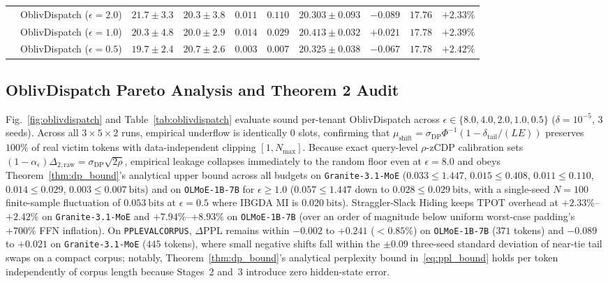 \documentclass[11pt,a4paper]{article}
\renewcommand{\_}{\textunderscore\allowbreak}
\def\OD{OblivDispatch}%
\theoremstyle{definition}
\theoremstyle{remark}
\newcommand{\OD}{\textsc{OblivDispatch}}
\begin{document}
\begin{table}[htbp]
{\begin{tabular}{llcccccccc}
      & \OD{} ($\epsilon = 2.0$) & $\mathbf{21.7 \pm 3.3}$ & $\mathbf{20.3 \pm 3.8}$ & $\mathbf{0.011}$ & $0.110$ & $20.303 \pm 0.093$ & $-0.089$ & $17.76$ & $+2.33\%$ \\
      & \OD{} ($\epsilon = 1.0$) & $\mathbf{20.3 \pm 4.8}$ & $\mathbf{20.0 \pm 2.9}$ & $\mathbf{0.014}$ & $0.029$ & $20.413 \pm 0.032$ & $+0.021$ & $17.78$ & $+2.39\%$ \\
      & \OD{} ($\epsilon = 0.5$) & $\mathbf{19.7 \pm 2.4}$ & $\mathbf{20.7 \pm 2.6}$ & $\mathbf{0.003}$ & $0.007$ & $20.325 \pm 0.038$ & $-0.067$ & $17.78$ & $+2.42\%$ \\
    \bottomrule
  \end{tabular}%
  }
\end{table}

\subsection{OblivDispatch Pareto Analysis and Theorem 2 Audit}
Fig.~\ref{fig:oblivdispatch} and Table~\ref{tab:oblivdispatch} evaluate sound per-tenant \OD{} across $\epsilon \in \{8.0, 4.0, 2.0, 1.0, 0.5\}$ ($\delta = 10^{-5}$, $3$ seeds). Across all $3 \times 5 \times 2$ runs, empirical underflow is identically $0$ slots, confirming that $\mu_{\mathrm{shift}} = \sigma_{\mathrm{DP}}\Phi^{-1}(1 - \delta_{\mathrm{tail}}/(LE))$ preserves $100\%$ of real victim tokens with data-independent clipping $[1, N_{\max}]$. Because exact query-level $\rho$-zCDP calibration sets $(1-\alpha_\epsilon)\Delta_{2,\mathrm{raw}} = \sigma_{\mathrm{DP}}\sqrt{2\rho}$, empirical leakage collapses immediately to the random floor even at $\epsilon = 8.0$ and obeys Theorem~\ref{thm:dp_bound}'s analytical upper bound across all budgets on \texttt{Granite-3.1-MoE} ($0.033 \le 1.447$, $0.015 \le 0.408$, $0.011 \le 0.110$, $0.014 \le 0.029$, $0.003 \le 0.007~\mathrm{bits}$) and on \texttt{OLMoE-1B-7B} for $\epsilon \ge 1.0$ ($0.057 \le 1.447$ down to $0.028 \le 0.029~\mathrm{bits}$, with a single-seed $N=100$ finite-sample fluctuation of $0.053~\mathrm{bits}$ at $\epsilon=0.5$ where IBGDA MI is $0.020~\mathrm{bits}$). Straggler-Slack Hiding keeps $\mathrm{TPOT}$ overhead at $+2.33\%$--$+2.42\%$ on \texttt{Granite-3.1-MoE} and $+7.94\%$--$+8.93\%$ on \texttt{OLMoE-1B-7B} (over an order of magnitude below uniform worst-case padding's $+700\%$ FFN inflation). On \texttt{PPL\_EVAL\_CORPUS}, $\Delta\mathrm{PPL}$ remains within $-0.002$ to $+0.241$ ($< 0.85\%$) on \texttt{OLMoE-1B-7B} ($371$ tokens) and $-0.089$ to $+0.021$ on \texttt{Granite-3.1-MoE} ($445$ tokens), where small negative shifts fall within the $\pm 0.09$ three-seed standard deviation of near-tie tail swaps on a compact corpus; notably, Theorem~\ref{thm:dp_bound}'s analytical perplexity bound in~\eqref{eq:ppl_bound} holds per token independently of corpus length because Stages~2 and~3 introduce zero hidden-state error.
\end{document}
